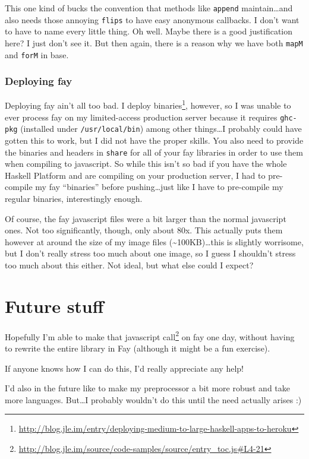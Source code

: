 \documentclass[]{article}
\renewcommand{\href}[2]{#2\footnote{\url{#1}}}
\begin{document}
This one kind of bucks the convention that methods like \texttt{append} maintain\ldots{}and also
needs those annoying \texttt{flips} to have easy anonymous callbacks. I don't want to have to name
every little thing. Oh well. Maybe there is a good justification here? I just don't see it. But then
again, there is a reason why we have both \texttt{mapM} and \texttt{forM} in base.

\subsubsection{Deploying fay}\label{deploying-fay}

Deploying fay ain't all too bad. I
\href{http://blog.jle.im/entry/deploying-medium-to-large-haskell-apps-to-heroku}{deploy binaries},
however, so I was unable to ever process fay on my limited-access production server because it
requires \texttt{ghc-pkg} (installed under \texttt{/usr/local/bin}) among other things\ldots{}I
probably could have gotten this to work, but I did not have the proper skills. You also need to
provide the binaries and headers in \texttt{share} for all of your fay libraries in order to use
them when compiling to javascript. So while this isn't so bad if you have the whole Haskell Platform
and are compiling on your production server, I had to pre-compile my fay ``binaries'' before
pushing\ldots{}just like I have to pre-compile my regular binaries, interestingly enough.

Of course, the fay javascript files were a bit larger than the normal javascript ones. Not too
significantly, though, only about 80x. This actually puts them however at around the size of my
image files (\textasciitilde{}100KB)\ldots{}this is slightly worrisome, but I don't really stress
too much about one image, so I guess I shouldn't stress too much about this either. Not ideal, but
what else could I expect?

\section{Future stuff}\label{future-stuff}

Hopefully I'm able to make
\href{http://blog.jle.im/source/code-samples/source/entry_toc.js\#L4-21}{that javascript call} on
fay one day, without having to rewrite the entire library in Fay (although it might be a fun
exercise).

If anyone knows how I can do this, I'd really appreciate any help!

I'd also in the future like to make my preprocessor a bit more robust and take more languages.
But\ldots{}I probably wouldn't do this until the need actually arises :)
\end{document}
